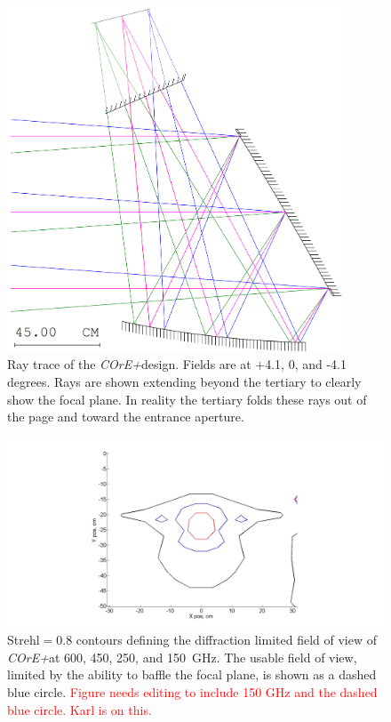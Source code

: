 \documentclass[11pt,a4paper]{article}
\newcommand{\comred}[1]{\textcolor{red}{#1}}
\newcommand{\coreplus}{\textit{\negthinspace COrE+\/}}
\begin{document}
\begin{figure}[htbp] %
	\centering
	\includegraphics[width=10cm]{xdragone_raytrace.png} 
	\caption{Ray trace of the \coreplus design. Fields are at +4.1, 0, and -4.1 degrees. Rays are shown extending beyond the tertiary 
		to clearly show the focal plane.  In reality the tertiary folds these rays out of the page and toward the entrance 
		aperture.  
	}
	\label{fig:raytrace_xdragone}
\end{figure}

\begin{figure}[htbp] %
	\centering
	\includegraphics[width=12cm]{strehl_250_450_600.jpg} 
	\caption{Strehl$=0.8$ contours defining the diffraction limited field of view of \coreplus at 600, 450, 250, and 150~GHz. 
		The usable field of view, limited by the ability to baffle the focal plane, is shown as a dashed blue circle.
		\comred{Figure needs editing to include 150 GHz and the dashed blue circle.  Karl is on this.} 
	}
	\label{fig:strehl_xdragone}
\end{figure}
\end{document}
